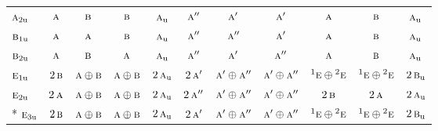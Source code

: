\documentclass[10pt,a4paper]{article}
\numberwithin{equation}{section}
\newcommand{\irr}[1]{\text{\normalfont\scshape #1}}
\newcommand{\conjpair}[1]{{}^{#1}}
\newcommand{\ptag}[1]{\mathrm{#1}}
\begin{document}
{\begin{longtable}{@{}lcccccccccc@{}}
$\irr{a}_{2\ptag{u}}$ & $\irr{a}$ & $\irr{b}$ & $\irr{b}$ & $\irr{a}_{\ptag{u}}$ & $\irr{a}''$ & $\irr{a}'$ & $\irr{a}'$ & $\irr{a}$ & $\irr{b}$ & $\irr{a}_{\ptag{u}}$\\
$\irr{b}_{1\ptag{u}}$ & $\irr{a}$ & $\irr{a}$ & $\irr{b}$ & $\irr{a}_{\ptag{u}}$ & $\irr{a}''$ & $\irr{a}''$ & $\irr{a}'$ & $\irr{a}$ & $\irr{b}$ & $\irr{a}_{\ptag{u}}$\\
$\irr{b}_{2\ptag{u}}$ & $\irr{a}$ & $\irr{b}$ & $\irr{a}$ & $\irr{a}_{\ptag{u}}$ & $\irr{a}''$ & $\irr{a}'$ & $\irr{a}''$ & $\irr{a}$ & $\irr{b}$ & $\irr{a}_{\ptag{u}}$\\
$\irr{e}_{1\ptag{u}}$ & $2\,\irr{b}$ & $\irr{a}\oplus \irr{b}$ & $\irr{a}\oplus \irr{b}$ & $2\,\irr{a}_{\ptag{u}}$ & $2\,\irr{a}'$ & $\irr{a}'\oplus \irr{a}''$ & $\irr{a}'\oplus \irr{a}''$ & $\conjpair{1}\irr{e}\oplus \conjpair{2}\irr{e}$ & $\conjpair{1}\irr{e}\oplus \conjpair{2}\irr{e}$ & $2\,\irr{b}_{\ptag{u}}$\\
$\irr{e}_{2\ptag{u}}$ & $2\,\irr{a}$ & $\irr{a}\oplus \irr{b}$ & $\irr{a}\oplus \irr{b}$ & $2\,\irr{a}_{\ptag{u}}$ & $2\,\irr{a}''$ & $\irr{a}'\oplus \irr{a}''$ & $\irr{a}'\oplus \irr{a}''$ & $2\,\irr{b}$ & $2\,\irr{a}$ & $2\,\irr{a}_{\ptag{u}}$\\*
$\irr{e}_{3\ptag{u}}$ & $2\,\irr{b}$ & $\irr{a}\oplus \irr{b}$ & $\irr{a}\oplus \irr{b}$ & $2\,\irr{a}_{\ptag{u}}$ & $2\,\irr{a}'$ & $\irr{a}'\oplus \irr{a}''$ & $\irr{a}'\oplus \irr{a}''$ & $\conjpair{1}\irr{e}\oplus \conjpair{2}\irr{e}$ & $\conjpair{1}\irr{e}\oplus \conjpair{2}\irr{e}$ & $2\,\irr{b}_{\ptag{u}}$\\
\bottomrule\end{longtable}}
\end{document}

